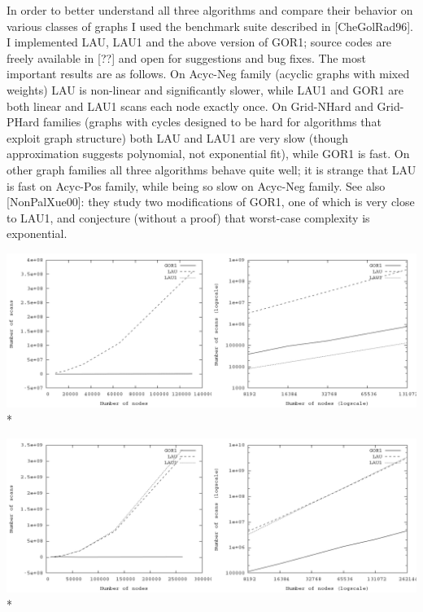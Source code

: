 \documentclass{article}
\newenvironment{Xfig}
    {\par\medskip\noindent\minipage{\linewidth}\begin{center}}
    {\end{center}\endminipage\par\medskip}
\theoremstyle{definition}
\begin{document}
\begin{multicols}{2}
In order to better understand all three algorithms and compare their behavior on various classes of graphs
I used the benchmark suite described in [CheGolRad96].
I implemented LAU, LAU1 and the above version of GOR1;
source codes are freely available in [??] and open for suggestions and bug fixes.
The most important results are as follows.
On Acyc-Neg family (acyclic graphs with mixed weights)
LAU is non-linear and significantly slower,
while LAU1 and GOR1 are both linear and LAU1 scans each node exactly once.
On Grid-NHard and Grid-PHard families (graphs with cycles designed to be hard for algorithms that exploit graph structure)
both LAU and LAU1 are very slow (though approximation suggests polynomial, not exponential fit),
while GOR1 is fast.
On other graph families all three algorithms behave quite well;
it is strange that LAU is fast on Acyc-Pos family, while being so slow on Acyc-Neg family.
See also [NonPalXue00]: they study two modifications of GOR1, one of which is very close to LAU1,
and conjecture (without a proof) that worst-case complexity is exponential.

\end{multicols}

\begin{Xfig}
\includegraphics[width=\linewidth]{img/plot_acyc_neg_both.png}\\*
\end{Xfig}

\begin{Xfig}
\includegraphics[width=\linewidth]{img/plot_grid_nhard_both.png}\\*
\end{Xfig}
\end{document}

